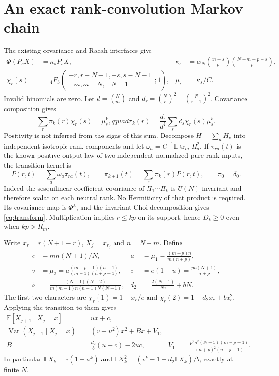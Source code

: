 \documentclass[11pt,a4paper]{article}
\newcommand{\EE}{\mathbb E}
\newcommand{\tr}{\operatorname{tr}}
\begin{document}
\newpage
\section{An exact rank-convolution Markov chain}
The existing covariance and Racah interfaces \cite{Kota,DLMF} give
\begin{align}
 \Phi(P_sX)&=\kappa_sP_sX,&
 \kappa_s&=w_N\binom{m-s}p\binom{N-m+p-s}p,\\
 \chi_r(s)&={}_4F_3\!\left(\begin{matrix}-r,r-N-1,-s,s-N-1\\
                  -m,m-N,-N-1\end{matrix};1\right),&
 \mu_s&=\kappa_s/C.
\end{align}
Invalid binomials are zero. Let $d=\binom Nm$ and
$d_r=\binom Nr^2-\binom N{r-1}^2$. Covariance composition gives
\begin{equation}
 \sum_r\pi_k(r)\chi_r(s)=\mu_s^k,qquad
 \pi_k(r)=\frac{d_r}{d^2}\sum_s d_s\chi_r(s)\mu_s^k.
 \label{eq:transform}
\end{equation}
Positivity is not inferred from the signs of this sum. Decompose
$H=\sum_a H_a$ into independent isotropic rank components and let
$\omega_a=C^{-1}\EE\tr_mH_a^2$. If $\pi_{ra}(t)$ is the known
positive output law of two independent normalized pure-rank
inputs, the transition kernel is
\begin{equation}
 P(r,t)=\sum_a\omega_a\pi_{ra}(t),\qquad
 \pi_{k+1}(t)=\sum_r\pi_k(r)P(r,t),\qquad \pi_0=\delta_0.
\end{equation}
Indeed the sesquilinear coefficient covariance of $H_1\cdots H_k$
is $U(N)$ invariant and therefore scalar on each neutral rank.
No Hermiticity of that product is required. Its covariance map is
$\Phi^k$, and the invariant Choi decomposition gives
\eqref{eq:transform}. Multiplication implies $r\le kp$ on its
support, hence $D_k\ge0$ even when $kp>R_m$.

Write $x_r=r(N+1-r)$, $X_j=x_{r_j}$ and $n=N-m$. Define
\begin{align}
 e&=mn(N+1)/N,&u&=\mu_1=\frac{(m-p)n}{m(n+p)},\\
 v&=\mu_2=u\frac{(m-p-1)(n-1)}{(m-1)(n+p-1)},&
 c&=e(1-u)=\frac{pn(N+1)}{n+p},\\
 b&=\frac{(N-1)(N-2)}{m(m-1)n(n-1)N(N+1)},&
 d_2&=\frac{2(N-1)}{Ne}+bN.
\end{align}
The first two characters are $\chi_r(1)=1-x_r/e$ and
$\chi_r(2)=1-d_2x_r+bx_r^2$. Applying the transition to them gives
\begin{align}
 \EE[X_{j+1}\mid X_j=x]&=ux+c,\label{eq:meanstep}\\
 \operatorname{Var}(X_{j+1}\mid X_j=x)
   &=(v-u^2)x^2+Bx+V_1,\label{eq:varstep}\\
 B&=\frac{d_2}{b}(u-v)-2uc,&
 V_1&=\frac{p^2n^2(N+1)(m-p+1)}{(n+p)^2(n+p-1)}.
\end{align}
In particular $\EE X_k=e(1-u^k)$ and
$\EE X_k^2=(v^k-1+d_2\EE X_k)/b$, exactly at finite $N$.
\end{document}
